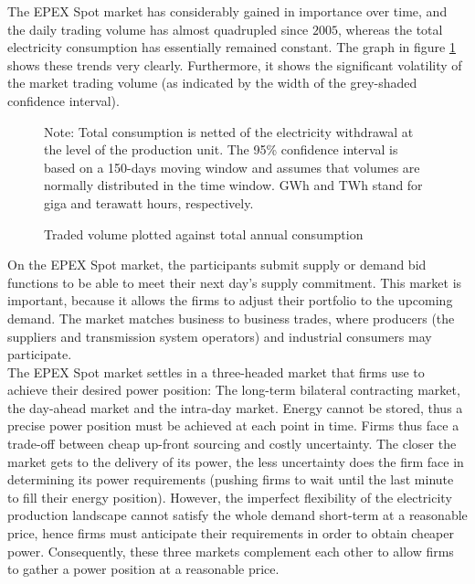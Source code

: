 The EPEX Spot market has considerably gained in importance over time, and the daily trading volume has almost quadrupled since $2005$, whereas the total electricity consumption has essentially remained constant. The graph in figure \ref{volconsfr} shows these trends very clearly. Furthermore, it shows the significant volatility of the market trading volume (as indicated by the width of the grey-shaded confidence interval).  \\
\begin{figure}[!ht]
\begin{center}  \end{center}
\caption{Traded volume plotted against total annual consumption}
\label{volconsfr}
{\small Note: Total consumption is netted of the electricity withdrawal at the level of the production unit. The 95\% confidence interval is based on a 150-days moving window and assumes that volumes are normally distributed in the time window. GWh and TWh stand for giga and terawatt hours, respectively.}
\end{figure}

On the EPEX Spot market, the participants submit supply or demand bid functions to be able to meet their next day's supply commitment. This market is important, because it allows the firms to adjust their portfolio to the upcoming demand. The market matches business to business trades, where producers (the suppliers and transmission system operators) and industrial consumers may participate.\\

The EPEX Spot market settles in a three-headed market that firms use to achieve their desired power position: The long-term bilateral contracting market, the day-ahead market and the intra-day market. Energy cannot be stored, thus a precise power position must be achieved at each point in time. Firms thus face a trade-off between cheap up-front sourcing and costly uncertainty. The closer the market gets to the delivery of its power, the less uncertainty does the firm face in determining its power requirements (pushing firms to wait until the last minute to fill their energy position). However, the imperfect flexibility of the electricity production landscape cannot satisfy the whole demand short-term at a reasonable price, hence firms must anticipate their requirements in order to obtain cheaper power. Consequently, these three markets complement each other to allow firms to gather a power position at a reasonable price. 

